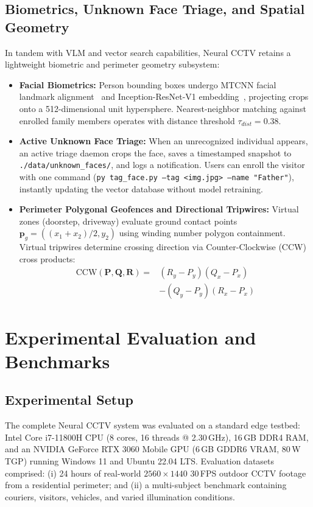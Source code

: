 \documentclass[10pt, conference]{IEEEtran}
\begin{document}
\subsection{Biometrics, Unknown Face Triage, and Spatial Geometry}
In tandem with VLM and vector search capabilities, Neural CCTV retains a lightweight biometric and perimeter geometry subsystem:
\begin{itemize}
    \item \textbf{Facial Biometrics:} Person bounding boxes undergo MTCNN facial landmark alignment~\cite{zhang2016joint} and Inception-ResNet-V1 embedding~\cite{szegedy2017inception}, projecting crops onto a 512-dimensional unit hypersphere. Nearest-neighbor matching against enrolled family members operates with distance threshold $\tau_{dist} = 0.38$.
    \item \textbf{Active Unknown Face Triage:} When an unrecognized individual appears, an active triage daemon crops the face, saves a timestamped snapshot to \texttt{./data/unknown\_faces/}, and logs a notification. Users can enroll the visitor with one command (\texttt{py tag\_face.py --tag <img.jpg> --name "Father"}), instantly updating the vector database without model retraining.
    \item \textbf{Perimeter Polygonal Geofences and Directional Tripwires:} Virtual zones (doorstep, driveway) evaluate ground contact points $\mathbf{p}_g = ((x_1 + x_2)/2, y_2)$ using winding number polygon containment. Virtual tripwires determine crossing direction via Counter-Clockwise (CCW) cross products:
    \begin{align}
    \label{eq:ccw}
    \text{CCW}(\mathbf{P}, \mathbf{Q}, \mathbf{R}) = &(R_y - P_y)(Q_x - P_x) \nonumber \\
    &- (Q_y - P_y)(R_x - P_x)
    \end{align}
\end{itemize}

\section{Experimental Evaluation and Benchmarks}
\label{sec:eval}

\subsection{Experimental Setup}
The complete Neural CCTV system was evaluated on a standard edge testbed: Intel Core i7-11800H CPU (8 cores, 16 threads @ 2.30\,GHz), 16\,GB DDR4 RAM, and an NVIDIA GeForce RTX 3060 Mobile GPU (6\,GB GDDR6 VRAM, 80\,W TGP) running Windows 11 and Ubuntu 22.04 LTS. Evaluation datasets comprised: (i) 24 hours of real-world $2560 \times 1440$ 30\,FPS outdoor CCTV footage from a residential perimeter; and (ii) a multi-subject benchmark containing couriers, visitors, vehicles, and varied illumination conditions.
\end{document}
